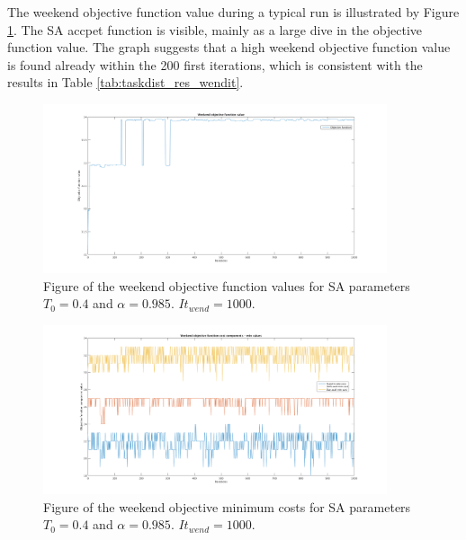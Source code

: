 The weekend objective function value during a typical run is illustrated by Figure \ref{fig:obj_fun_vals}. The SA accpet function is visible, mainly as a large dive in the objective function value. The graph suggests that a high weekend objective function value is found already within the 200 first iterations, which is consistent with the results in Table \ref{tab:taskdist_res_wendit}.

\begin{figure}[!htbp]
\centering
\includegraphics[width=0.9\textwidth, trim = 100px 0px 100px 20px, clip]{Chapters/ImagesEmelie/Plot_1000_20.png}
\caption{Figure of the weekend objective function values for SA parameters $T_0 = 0.4$ and $\alpha = 0.985$. $It_{wend} = 1000$.}
\label{fig:obj_fun_vals}
\end{figure}


\begin{figure}[!htbp]
\centering
\includegraphics[width=0.9\textwidth, trim = 100px 0px 100px 20px, clip]{Chapters/ImagesEmelie/Components_1000_20.png}
\caption{Figure of the weekend objective minimum costs for SA parameters $T_0 = 0.4$ and $\alpha = 0.985$. $It_{wend} = 1000$.}
\label{fig:obj_fun_comp}
\end{figure}

